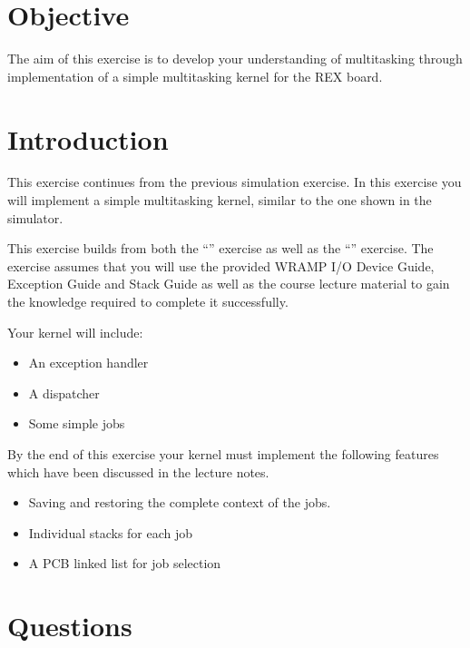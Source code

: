 \documentclass[a4paper,10pt]{article}
\begin{document}
\section{Objective}

The aim of this exercise is to develop your understanding of
multitasking through implementation of a simple multitasking kernel
for the REX board.

\section{Introduction}

This exercise continues from the previous simulation exercise. In this
exercise you will implement a simple multitasking kernel, similar to
the one shown in the simulator.

This exercise builds from both the ``\INTERTITLE'' exercise as well as
the ``\MTKSTITLE'' exercise. The exercise assumes that you will use
the provided WRAMP I/O Device Guide, Exception Guide and Stack Guide
as well as the course lecture material to gain the knowledge required
to complete it successfully.

Your kernel will include:
\begin{itemize}
\setlength{\itemsep}{0cm}
\setlength{\parskip}{0cm}
\item An exception handler
\item A dispatcher
\item Some simple jobs
\end{itemize}

By the end of this exercise your kernel must implement the following
features which have been discussed in the lecture notes.
\begin{itemize}
\setlength{\itemsep}{0cm}
\setlength{\parskip}{0cm}
\item Saving and restoring the complete context of the jobs.
\item Individual stacks for each job
\item A PCB linked list for job selection
\end{itemize}

\section{Questions}
\end{document}
